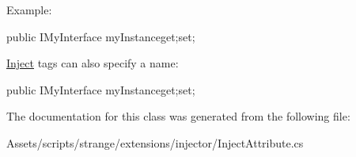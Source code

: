Example\-: \begin{DoxyVerb}[Inject]
public IMyInterface myInstance{get;set;}
\end{DoxyVerb}


\hyperlink{class_inject}{Inject} tags can also specify a name\-:

\begin{DoxyVerb}
public IMyInterface myInstance{get;set;}\end{DoxyVerb}
 

The documentation for this class was generated from the following file\-:\begin{DoxyCompactItemize}
\item 
Assets/scripts/strange/extensions/injector/Inject\-Attribute.\-cs\end{DoxyCompactItemize}
